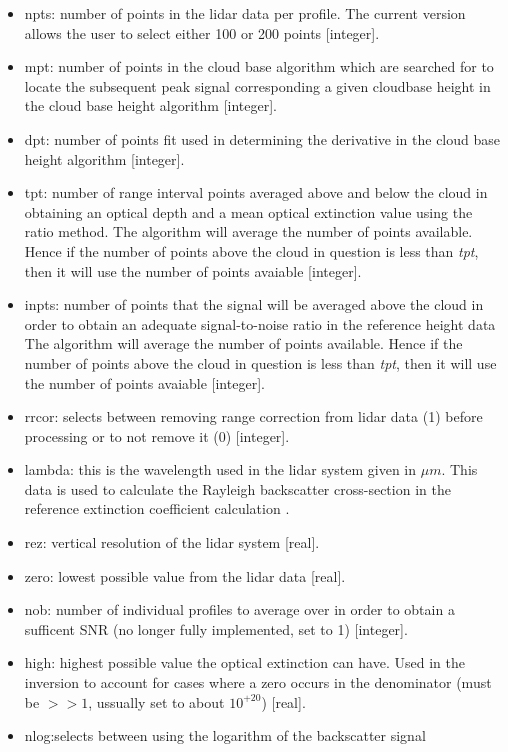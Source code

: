 \begin{itemize}
\item npts: number of points in the lidar data per profile. The current 
version allows the user to select either 100 or 200 points [integer].
\item mpt: number of points in the cloud base algorithm which are searched
for to locate the subsequent peak signal corresponding a given cloudbase
height in the cloud base height algorithm [integer].
\item dpt: number of points fit used in determining the derivative in the
cloud base height algorithm [integer].
\item tpt: number of range interval points averaged 
above and below the cloud in obtaining an optical 
depth and a mean optical extinction value
using the ratio method. The algorithm will average the number of
points available. Hence if the number of points above the cloud
in question is less than {\em tpt}, then  it will use the number of
points avaiable [integer].
\item inpts: number of points that the signal will be averaged above
the cloud in order to obtain an adequate signal-to-noise ratio
in the reference height data The algorithm will average the number of
points available. Hence if the number of points above the cloud
in question is less than {\em tpt}, then  it will use the number of
points avaiable [integer].
\item rrcor: selects between removing range correction from lidar data
(1) before processing or to not remove it (0) [integer].
\item lambda: this is the wavelength used in the lidar system given
in $\mu m$. This data is used to calculate the Rayleigh 
backscatter cross-section in the reference extinction coefficient
calculation \cite{mn}.
\item rez: vertical resolution of the lidar system [real].
\item zero: lowest possible value from the lidar data [real].
\item nob: number of individual profiles to average over in order to
obtain a sufficent SNR (no longer fully implemented, set to 1) [integer].
\item high: highest possible value the optical extinction can have. Used in
the inversion to account for cases where a zero occurs in
the denominator (must be $>>1$, ussually set to about $10^{+20}$) [real].
\item nlog:selects between using the logarithm of the backscatter signal

\end{itemize}
